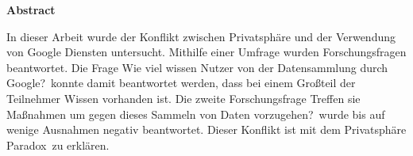 \vspace{2em}
\begin{center}
	\begin{large}
		\textbf{Abstract}
	\end{large}
\end{center}
\vspace{0.75em}
In dieser Arbeit wurde der Konflikt zwischen Privatsphäre und der Verwendung von Google Diensten untersucht. Mithilfe einer Umfrage wurden Forschungsfragen beantwortet. Die Frage \glqq Wie viel wissen Nutzer von der Datensammlung durch Google?\grqq\ konnte damit beantwortet werden, dass bei einem Großteil der Teilnehmer Wissen vorhanden ist. Die zweite Forschungsfrage \glqq Treffen sie Maßnahmen um gegen dieses Sammeln von Daten vorzugehen?\grqq\ wurde bis auf wenige Ausnahmen negativ beantwortet. Dieser Konflikt ist mit dem \glqq Privatsphäre Paradox\grqq\ zu erklären.